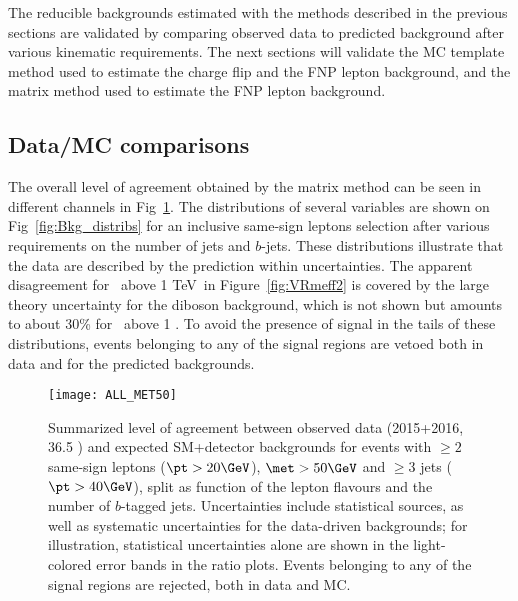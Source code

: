 The reducible backgrounds estimated with the methods described in the previous 
sections are validated by comparing observed data to 
predicted background after various kinematic requirements. 
The next sections will validate 
the MC template method used to estimate the charge flip and the FNP lepton 
background, and the matrix method used to estimate the FNP lepton background.



\subsection*{Data/MC comparisons}

The overall level of agreement obtained by the matrix method
can be seen in different channels in Fig~\ref{fig:distributions_summary}. 
The distributions of several variables are shown on Fig~\ref{fig:Bkg_distribs} for an inclusive same-sign leptons selection
after various requirements on the number of jets and $b$-jets.
These distributions illustrate that the data are described by the prediction 
within uncertainties. 
The apparent disagreement 
for \meff\ above 1 TeV~in Figure~\ref{fig:VRmeff2} is covered by the large 
theory uncertainty for the diboson background, which is not shown 
but amounts to about 30\% for \meff\ above 1 \TeV. 
To avoid the presence of signal in the tails of these distributions, 
events belonging to any of the signal regions are vetoed 
both in data and for the predicted backgrounds. 

\begin{figure}[t!]
\centering
\texttt{[image: ALL\_MET50]}
\caption{Summarized level of agreement between observed data (2015+2016, 36.5 \ifb) and expected SM+detector backgrounds 
for events with $\ge 2$ same-sign leptons ($\pt>20 \GeV$), $\met>50 \GeV$ and $\ge 3$ jets ($\pt>40 \GeV$), 
split as function of the lepton flavours and the number of $b$-tagged jets. 
Uncertainties include statistical sources, as well as systematic uncertainties for the data-driven backgrounds; 
for illustration, statistical uncertainties alone are shown in the light-colored error bands in the ratio plots. 
Events belonging to any of the signal regions are rejected, both in data and MC. 
}
\label{fig:distributions_summary}
\end{figure} 


